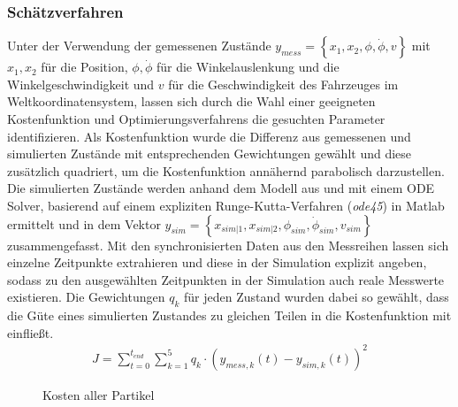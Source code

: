 \subsubsection{Schätzverfahren}
Unter der Verwendung der gemessenen Zustände $y_{mess} = \left \{x_1, x_2, \phi, \dot{\phi}, v  \right \}$ mit $x_1, x_2$ für die Position, $\phi, \dot{\phi}$ für die Winkelauslenkung und die Winkelgeschwindigkeit und $v$ für die Geschwindigkeit des Fahrzeuges im Weltkoordinatensystem, lassen sich durch die Wahl einer geeigneten Kostenfunktion und Optimierungsverfahrens die gesuchten Parameter identifizieren. Als Kostenfunktion wurde die Differenz aus gemessenen und simulierten Zustände mit entsprechenden Gewichtungen gewählt und diese zusätzlich quadriert, um die Kostenfunktion annähernd parabolisch darzustellen. Die simulierten Zustände werden anhand dem Modell aus \cite{VikAnd} und mit einem ODE Solver, basierend auf einem expliziten Runge-Kutta-Verfahren (\textit{ode45}) in Matlab ermittelt und in dem Vektor $y_{sim} = \left \{x_{sim|1}, x_{sim|2}, \phi_{sim}, \dot{\phi}_{sim}, v_{sim}  \right \}$ zusammengefasst. Mit den synchronisierten Daten aus den Messreihen lassen sich einzelne Zeitpunkte extrahieren und diese in der Simulation explizit angeben, sodass zu den ausgewählten Zeitpunkten in der Simulation auch reale Messwerte existieren. Die Gewichtungen $q_k$ für jeden Zustand wurden dabei so gewählt, dass die Güte eines simulierten Zustandes zu gleichen Teilen in die Kostenfunktion mit einfließt.
\begin{align*}
J = \sum_{t=0}^{t_{end}}\sum_{k = 1}^{5} q_k\cdot  \left (y_{mess, k}\left ( t \right ) - y_{sim, k}\left ( t \right )  \right )^2
\end{align*}
\begin{figure} 
 \GenerationLokal
\centering
{}
\caption{Kosten aller Partikel}
\label{pict:PSOallePart}
\end{figure}
